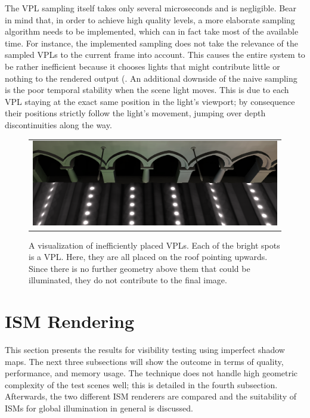 The VPL sampling itself takes only several microseconds and is negligible. Bear in mind that, in order to achieve high quality levels, a more elaborate sampling algorithm needs to be implemented, which can in fact take most of the available time. For instance, the implemented sampling does not take the relevance of the sampled VPLs to the current frame into account. This causes the entire system to be rather inefficient because it chooses lights that might contribute little or nothing to the rendered output (. An additional downside of the naive sampling is the poor temporal stability when the scene light moves. This is due to each VPL staying at the exact same position in the light's viewport; by consequence their positions strictly follow the light's movement, jumping over depth discontinuities along the way.

\begin{figure}[htb]
\centering
  \begin{tabular}{@{}c@{}}
    \includegraphics[width=1.0\textwidth]{screenshots/RSM_unfavorable} \\
  \end{tabular}
  \caption{A visualization of inefficiently placed VPLs. Each of the bright spots is a VPL. Here, they are all placed on the roof pointing upwards. Since there is no further geometry above them that could be illuminated, they do not contribute to the final image.}
  \label{fig:results:RSMUnfavorable}
\end{figure}




\section{ISM Rendering}
\label{sec:results:ism}

This section presents the results for visibility testing using imperfect shadow maps. The next three subsections will show the outcome in terms of quality, performance, and memory usage. The technique does not handle high geometric complexity of the test scenes well; this is detailed in the fourth subsection. Afterwards, the two different ISM renderers are compared and the suitability of ISMs for global illumination in general is discussed.


